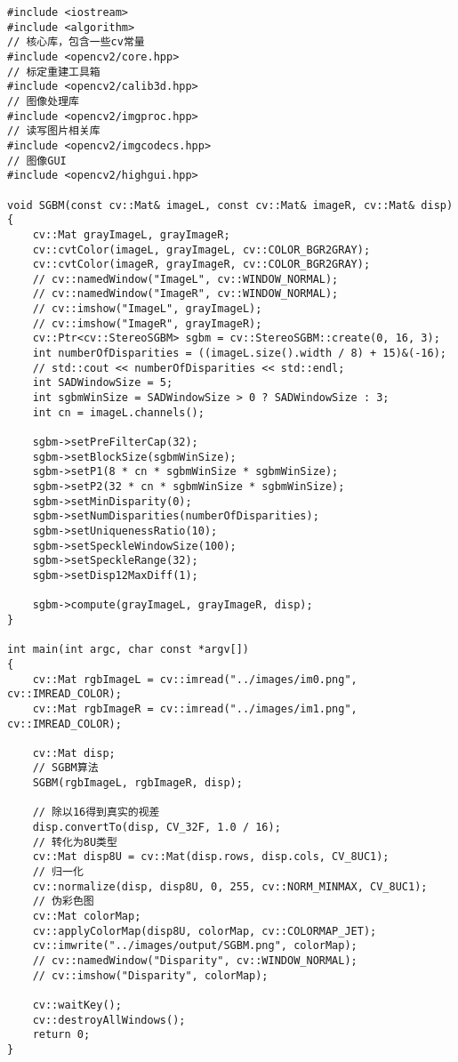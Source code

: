 \documentclass[10.5pt, a4paper]{article}
\begin{document}
\begin{lstlisting}
#include <iostream>
#include <algorithm>
// 核心库，包含一些cv常量
#include <opencv2/core.hpp>
// 标定重建工具箱
#include <opencv2/calib3d.hpp>
// 图像处理库
#include <opencv2/imgproc.hpp>
// 读写图片相关库
#include <opencv2/imgcodecs.hpp>
// 图像GUI
#include <opencv2/highgui.hpp>

void SGBM(const cv::Mat& imageL, const cv::Mat& imageR, cv::Mat& disp) {
    cv::Mat grayImageL, grayImageR;
    cv::cvtColor(imageL, grayImageL, cv::COLOR_BGR2GRAY);
    cv::cvtColor(imageR, grayImageR, cv::COLOR_BGR2GRAY);
    // cv::namedWindow("ImageL", cv::WINDOW_NORMAL);
    // cv::namedWindow("ImageR", cv::WINDOW_NORMAL);
    // cv::imshow("ImageL", grayImageL);
    // cv::imshow("ImageR", grayImageR);
    cv::Ptr<cv::StereoSGBM> sgbm = cv::StereoSGBM::create(0, 16, 3);
    int numberOfDisparities = ((imageL.size().width / 8) + 15)&(-16);
    // std::cout << numberOfDisparities << std::endl;
    int SADWindowSize = 5;
    int sgbmWinSize = SADWindowSize > 0 ? SADWindowSize : 3;
    int cn = imageL.channels();

    sgbm->setPreFilterCap(32);
    sgbm->setBlockSize(sgbmWinSize);
    sgbm->setP1(8 * cn * sgbmWinSize * sgbmWinSize);
    sgbm->setP2(32 * cn * sgbmWinSize * sgbmWinSize);
    sgbm->setMinDisparity(0);
    sgbm->setNumDisparities(numberOfDisparities);
    sgbm->setUniquenessRatio(10);
    sgbm->setSpeckleWindowSize(100);
    sgbm->setSpeckleRange(32);
    sgbm->setDisp12MaxDiff(1);
    
    sgbm->compute(grayImageL, grayImageR, disp);
}

int main(int argc, char const *argv[])
{
    cv::Mat rgbImageL = cv::imread("../images/im0.png", cv::IMREAD_COLOR);
    cv::Mat rgbImageR = cv::imread("../images/im1.png", cv::IMREAD_COLOR);

    cv::Mat disp;
    // SGBM算法
    SGBM(rgbImageL, rgbImageR, disp);

    // 除以16得到真实的视差
    disp.convertTo(disp, CV_32F, 1.0 / 16);
    // 转化为8U类型
    cv::Mat disp8U = cv::Mat(disp.rows, disp.cols, CV_8UC1);
    // 归一化
    cv::normalize(disp, disp8U, 0, 255, cv::NORM_MINMAX, CV_8UC1);
    // 伪彩色图
    cv::Mat colorMap;
    cv::applyColorMap(disp8U, colorMap, cv::COLORMAP_JET);
    cv::imwrite("../images/output/SGBM.png", colorMap);
    // cv::namedWindow("Disparity", cv::WINDOW_NORMAL);
    // cv::imshow("Disparity", colorMap);
    
    cv::waitKey();
    cv::destroyAllWindows();
    return 0;
}
\end{lstlisting}
\end{document}
